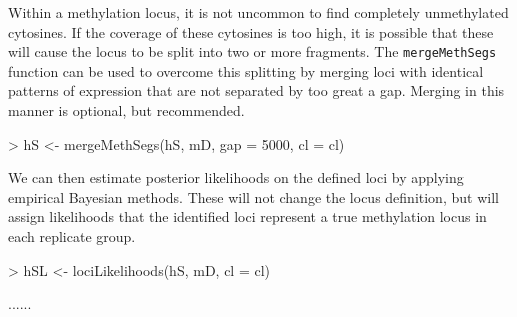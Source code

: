 \documentclass[a4paper]{article}
\begin{document}
Within a methylation locus, it is not uncommon to find completely unmethylated cytosines. If the coverage of these cytosines is too high, it is possible that these will cause the locus to be split into two or more fragments. The \verb'mergeMethSegs' function can be used to overcome this splitting by merging loci with identical patterns of expression that are not separated by too great a gap. Merging in this manner is optional, but recommended.

\begin{Schunk}
\begin{Sinput}
> hS <- mergeMethSegs(hS, mD, gap = 5000, cl = cl)
\end{Sinput}
\end{Schunk}

We can then estimate posterior likelihoods on the defined loci by applying empirical Bayesian methods. These will not change the locus definition, but will assign likelihoods that the identified loci represent a true methylation locus in each replicate group.

\begin{Schunk}
\begin{Sinput}
> hSL <- lociLikelihoods(hS, mD, cl = cl)
\end{Sinput}
\begin{Soutput}
......
\end{Soutput}
\end{Schunk}
\end{document}
